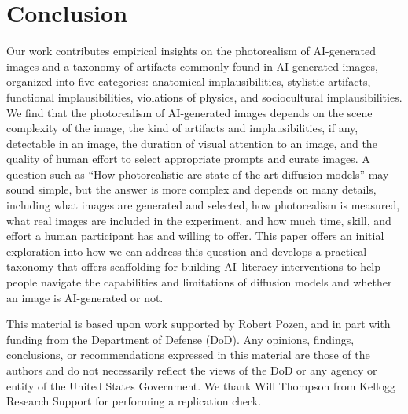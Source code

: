 \section{Conclusion}\label{sec:con}

Our work contributes empirical insights on the photorealism of AI-generated images and a taxonomy of artifacts commonly found in AI-generated images, organized into five categories: anatomical implausibilities, stylistic artifacts, functional implausibilities, violations of physics, and sociocultural implausibilities. We find that the photorealism of AI-generated images depends on the scene complexity of the image, the kind of artifacts and implausibilities, if any, detectable in an image, the duration of visual attention to an image, and the quality of human effort to select appropriate prompts and curate images. A question such as ``How photorealistic are state-of-the-art diffusion models'' may sound simple, but the answer is more complex and depends on many details, including what images are generated and selected, how photorealism is measured, what real images are included in the experiment, and how much time, skill, and effort a human participant has and willing to offer. This paper offers an initial exploration into how we can address this question and develops a practical taxonomy that offers scaffolding for building AI--literacy interventions to help people navigate the capabilities and limitations of diffusion models and whether an image is AI-generated or not. 

\begin{acks}

This material is based upon work supported by Robert Pozen, and in part with funding from the Department of Defense (DoD). Any opinions, findings, conclusions, or recommendations expressed in this material are those of the authors and do not necessarily reflect the views of the DoD or any agency or entity of the United States Government. We thank Will Thompson from Kellogg Research Support for performing a replication check.
\end{acks}